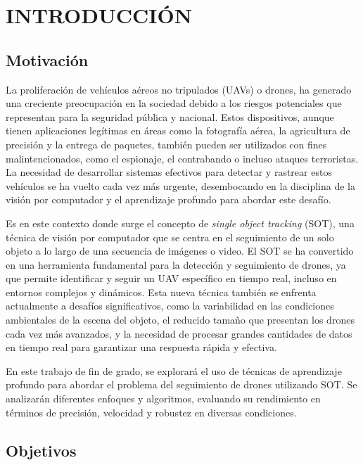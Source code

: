 

\chapter{INTRODUCCIÓN}  

\section{Motivación}

La proliferación de vehículos aéreos no tripulados (UAVs) o drones, ha generado una creciente preocupación en la sociedad debido a los riesgos potenciales que representan para la seguridad pública y nacional. Estos dispositivos, aunque tienen aplicaciones legítimas en áreas como la fotografía aérea, la agricultura de precisión y la entrega de paquetes, también pueden ser utilizados con fines malintencionados, como el espionaje, el contrabando o incluso \cite{review_infrared_imaging} ataques terroristas. La necesidad de desarrollar sistemas efectivos para detectar y rastrear estos vehículos se ha vuelto cada vez más urgente, desembocando en la disciplina de la visión por computador y el aprendizaje profundo \cite{hddrones_historia} para abordar este desafío.



Es en este contexto donde surge el concepto de \textit{single object tracking} (SOT), una técnica de visión por computador que se centra en el seguimiento de un solo objeto a lo largo de una secuencia de imágenes o video. El SOT se ha convertido en una herramienta fundamental para la detección y seguimiento de drones, ya que permite identificar y seguir un UAV específico en tiempo real, incluso en entornos complejos y dinámicos. Esta nueva técnica también se enfrenta actualmente a desafíos significativos, como la variabilidad en las condiciones ambientales de la escena del objeto, el reducido tamaño que presentan los drones cada vez más avanzados, y la necesidad de procesar grandes cantidades de datos en tiempo real para garantizar una respuesta rápida y efectiva.

En este trabajo de fin de grado, se explorará el uso de técnicas de aprendizaje profundo para abordar el problema del seguimiento de drones utilizando SOT. Se analizarán diferentes enfoques y algoritmos, evaluando su rendimiento en términos de precisión, velocidad y robustez en diversas condiciones. 

\section{Objetivos}

\lipsum[1-4]

    
